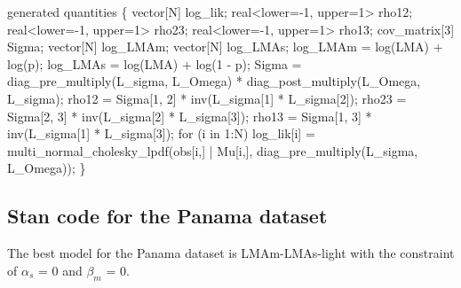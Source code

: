 \documentclass[
  12pt,
  letterpaper,
  DIV=11,
  numbers=noendperiod]{scrartcl}
\newenvironment{Shaded}{\begin{snugshade}}{\end{snugshade}}
\newcommand{\ControlFlowTok}[1]{\textcolor[rgb]{0.00,0.23,0.31}{#1}}
\newcommand{\DataTypeTok}[1]{\textcolor[rgb]{0.68,0.00,0.00}{#1}}
\newcommand{\DecValTok}[1]{\textcolor[rgb]{0.68,0.00,0.00}{#1}}
\newcommand{\KeywordTok}[1]{\textcolor[rgb]{0.00,0.23,0.31}{#1}}
\newcommand{\NormalTok}[1]{\textcolor[rgb]{0.00,0.23,0.31}{#1}}
\begin{document}
\begin{Shaded}
\begin{Highlighting}[]
\KeywordTok{generated quantities}\NormalTok{ \{}
  \DataTypeTok{vector}\NormalTok{[N] log\_lik;}
  \DataTypeTok{real}\NormalTok{\textless{}}\KeywordTok{lower}\NormalTok{={-}}\DecValTok{1}\NormalTok{, }\KeywordTok{upper}\NormalTok{=}\DecValTok{1}\NormalTok{\textgreater{} rho12;}
  \DataTypeTok{real}\NormalTok{\textless{}}\KeywordTok{lower}\NormalTok{={-}}\DecValTok{1}\NormalTok{, }\KeywordTok{upper}\NormalTok{=}\DecValTok{1}\NormalTok{\textgreater{} rho23;}
  \DataTypeTok{real}\NormalTok{\textless{}}\KeywordTok{lower}\NormalTok{={-}}\DecValTok{1}\NormalTok{, }\KeywordTok{upper}\NormalTok{=}\DecValTok{1}\NormalTok{\textgreater{} rho13;}
  \DataTypeTok{cov\_matrix}\NormalTok{[}\DecValTok{3}\NormalTok{] Sigma;}
  \DataTypeTok{vector}\NormalTok{[N] log\_LMAm;}
  \DataTypeTok{vector}\NormalTok{[N] log\_LMAs;}
\NormalTok{  log\_LMAm = log(LMA) + log(p);}
\NormalTok{  log\_LMAs = log(LMA) + log(}\DecValTok{1}\NormalTok{ {-} p);}
\NormalTok{  Sigma = diag\_pre\_multiply(L\_sigma, L\_Omega)}
\NormalTok{     * diag\_post\_multiply(L\_Omega\textquotesingle{}, L\_sigma);}
\NormalTok{  rho12 = Sigma[}\DecValTok{1}\NormalTok{, }\DecValTok{2}\NormalTok{] * inv(L\_sigma[}\DecValTok{1}\NormalTok{] * L\_sigma[}\DecValTok{2}\NormalTok{]);}
\NormalTok{  rho23 = Sigma[}\DecValTok{2}\NormalTok{, }\DecValTok{3}\NormalTok{] * inv(L\_sigma[}\DecValTok{2}\NormalTok{] * L\_sigma[}\DecValTok{3}\NormalTok{]);}
\NormalTok{  rho13 = Sigma[}\DecValTok{1}\NormalTok{, }\DecValTok{3}\NormalTok{] * inv(L\_sigma[}\DecValTok{1}\NormalTok{] * L\_sigma[}\DecValTok{3}\NormalTok{]);}
  \ControlFlowTok{for}\NormalTok{ (i }\ControlFlowTok{in} \DecValTok{1}\NormalTok{:N)}
\NormalTok{   log\_lik[i] = multi\_normal\_cholesky\_lpdf(obs[i,] | Mu[i,], diag\_pre\_multiply(L\_sigma, L\_Omega));}
\NormalTok{ \}}
\end{Highlighting}
\end{Shaded}

\hypertarget{stan-code-for-the-panama-dataset}{%
\subsection{Stan code for the Panama
dataset}\label{stan-code-for-the-panama-dataset}}

The best model for the Panama dataset is LMAm-LMAs-light with the
constraint of \(\alpha_s\) = 0 and \(\beta_m\) = 0.
\end{document}
